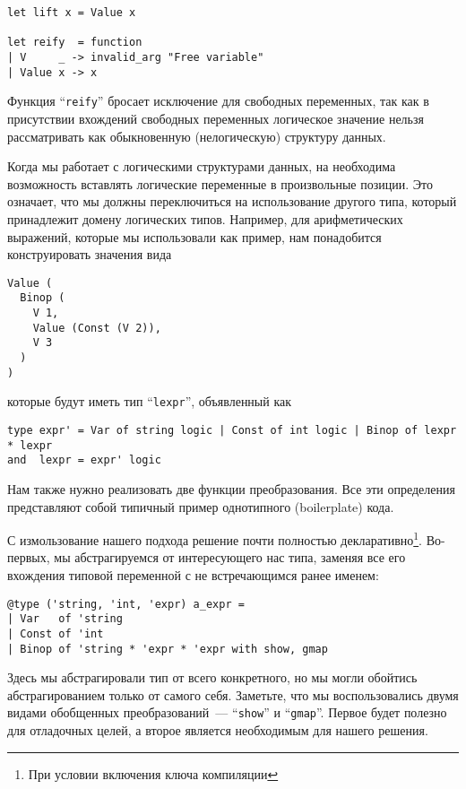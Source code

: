 \begin{lstlisting}
let lift x = Value x

let reify  = function
| V     _ -> invalid_arg "Free variable"
| Value x -> x
\end{lstlisting}

Функция ``\lstinline{reify}'' бросает исключение для свободных переменных, так как в присутствии вхождений свободных переменных
логическое значение нельзя рассматривать как обыкновенную (нелогическую) структуру данных.

Когда мы работает с логическими структурами данных, на необходима возможность вставлять логические переменные в произвольные позиции.
Это означает, что мы должны переключиться на использование другого типа, который принадлежит домену логических типов. Например,
для арифметических выражений, которые мы использовали как пример, нам понадобится конструировать значения вида

\begin{lstlisting}
Value (
  Binop (
    V 1, 
    Value (Const (V 2)),
    V 3
  )
)
\end{lstlisting}

которые будут иметь тип ``\lstinline{lexpr}'', объявленный как

\begin{lstlisting}
type expr' = Var of string logic | Const of int logic | Binop of lexpr * lexpr
and  lexpr = expr' logic
\end{lstlisting}

Нам также нужно реализовать две функции преобразования. Все эти определения представляют собой типичный пример однотипного (boilerplate) кода.

С измользование нашего подхода решение почти полностью декларативно\footnote{При условии включения ключа компиляции }.
Во-первых, мы абстрагируемся от интересующего нас типа, заменяя все его вхождения типовой переменной с не встречающимся ранее именем:

\begin{lstlisting}
@type ('string, 'int, 'expr) a_expr =
| Var   of 'string
| Const of 'int
| Binop of 'string * 'expr * 'expr with show, gmap
\end{lstlisting}

Здесь мы абстрагировали тип от всего конкретного, но мы могли обойтись абстрагированием только от самого себя. Заметьте, что 
мы воспользовались двумя видами обобщенных преобразований~--- ``\lstinline{show}'' и ``\lstinline{gmap}''. 
Первое будет полезно для отладочных целей, а второе является необходимым для нашего решения.

